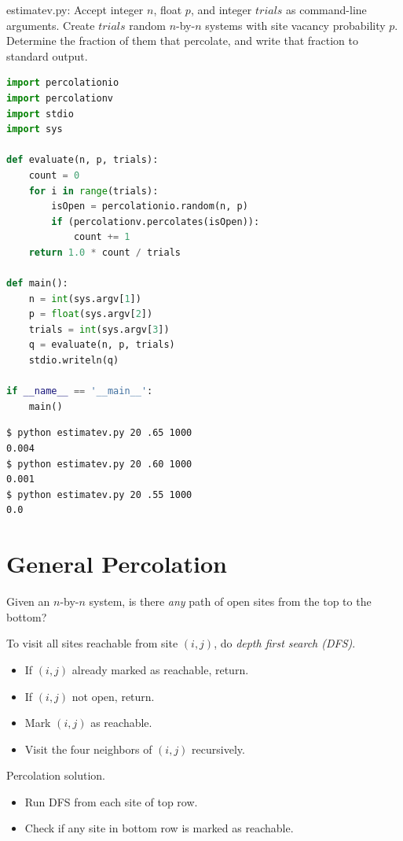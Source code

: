 \documentclass[8pt,a4paper,compress,handout]{beamer}
\begin{document}
\begin{frame}[fragile]
\begin{framed}
\tiny estimatev.py: Accept integer $n$, float $p$, and integer $trials$ as command-line arguments. Create $trials$ random $n$-by-$n$ systems with site vacancy probability $p$. Determine the fraction of them that percolate, and
write that fraction to standard output.
\end{framed}

\begin{lstlisting}[language=Python]
import percolationio
import percolationv
import stdio
import sys

def evaluate(n, p, trials):
    count = 0
    for i in range(trials):
        isOpen = percolationio.random(n, p)
        if (percolationv.percolates(isOpen)):
            count += 1
    return 1.0 * count / trials

def main():
    n = int(sys.argv[1])
    p = float(sys.argv[2])
    trials = int(sys.argv[3])
    q = evaluate(n, p, trials)
    stdio.writeln(q)
    
if __name__ == '__main__': 
    main()
\end{lstlisting}

\begin{lstlisting}[language={}]
$ python estimatev.py 20 .65 1000
0.004
$ python estimatev.py 20 .60 1000
0.001
$ python estimatev.py 20 .55 1000
0.0
\end{lstlisting}
\end{frame}

\section{General Percolation}
\begin{frame}[fragile]
Given an $n$-by-$n$ system, is there \emph{any} path of open sites from the top to the bottom?

\bigskip

To visit all sites reachable from site $(i, j)$, do \emph{depth first search (DFS)}.
\begin{itemize}
\item If $(i, j)$ already marked as reachable, return.
\item If $(i, j)$ not open, return.
\item Mark $(i, j)$ as reachable.
\item Visit the four neighbors of $(i, j)$ recursively.
\end{itemize}

\bigskip

Percolation solution.
\begin{itemize}
\item Run DFS from each site of top row.
\item Check if any site in bottom row is marked as reachable.
\end{itemize}
\end{frame}
\end{document}
